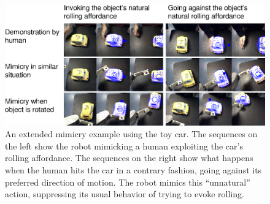 \begin{figure}[tb]
\begin{center}
\includegraphics[width=\columnwidth]{fig-mimicry-awkward.eps}
\caption{ 
\label{fig:mimicked-action}
%
An extended mimicry example using the toy car.
The sequences on the left show the robot mimicking a human exploiting
the car's rolling affordance.  The sequences on the right show
what happens when the human hits the car in a contrary fashion, going
against its preferred direction of motion.  The robot mimics this 
``unnatural'' action, suppressing its usual behavior of trying to
evoke rolling.
%
}
\end{center}
\end{figure}

